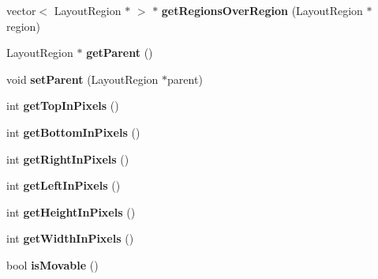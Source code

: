 \begin{CompactItemize}
\item 
vector$<$ LayoutRegion $\ast$ $>$ $\ast$ \textbf{getRegionsOverRegion} (LayoutRegion $\ast$region)\label{classbr_1_1pucrio_1_1telemidia_1_1ginga_1_1ncl_1_1model_1_1presentation_1_1FormatterDeviceRegion_9306f1c51fbdbb8e1a503dffe3e97c57}

\item 
LayoutRegion $\ast$ \textbf{getParent} ()\label{classbr_1_1pucrio_1_1telemidia_1_1ginga_1_1ncl_1_1model_1_1presentation_1_1FormatterDeviceRegion_fd1013cb706324f5087fdffc95ed68c2}

\item 
void \textbf{setParent} (LayoutRegion $\ast$parent)\label{classbr_1_1pucrio_1_1telemidia_1_1ginga_1_1ncl_1_1model_1_1presentation_1_1FormatterDeviceRegion_621f5652e3a0d7e3d8989a1f6511e920}

\item 
int \textbf{getTopInPixels} ()\label{classbr_1_1pucrio_1_1telemidia_1_1ginga_1_1ncl_1_1model_1_1presentation_1_1FormatterDeviceRegion_040ae772c79e6c059af09e2ae20cef44}

\item 
int \textbf{getBottomInPixels} ()\label{classbr_1_1pucrio_1_1telemidia_1_1ginga_1_1ncl_1_1model_1_1presentation_1_1FormatterDeviceRegion_7eba0e5ad21e897dff869c8aaae6c9c1}

\item 
int \textbf{getRightInPixels} ()\label{classbr_1_1pucrio_1_1telemidia_1_1ginga_1_1ncl_1_1model_1_1presentation_1_1FormatterDeviceRegion_a53d01db14129a1226b6a7e017f47b08}

\item 
int \textbf{getLeftInPixels} ()\label{classbr_1_1pucrio_1_1telemidia_1_1ginga_1_1ncl_1_1model_1_1presentation_1_1FormatterDeviceRegion_c113dffc9298502d3404b5019c83fd37}

\item 
int \textbf{getHeightInPixels} ()\label{classbr_1_1pucrio_1_1telemidia_1_1ginga_1_1ncl_1_1model_1_1presentation_1_1FormatterDeviceRegion_d4a81747349c81b1a5ca209861694c72}

\item 
int \textbf{getWidthInPixels} ()\label{classbr_1_1pucrio_1_1telemidia_1_1ginga_1_1ncl_1_1model_1_1presentation_1_1FormatterDeviceRegion_1e0a542fa49c0776e50d765c5ec82ba2}

\item 
bool \textbf{isMovable} ()\label{classbr_1_1pucrio_1_1telemidia_1_1ginga_1_1ncl_1_1model_1_1presentation_1_1FormatterDeviceRegion_c33483f6f507e50f584f45fecc1017e6}


\end{CompactItemize}

